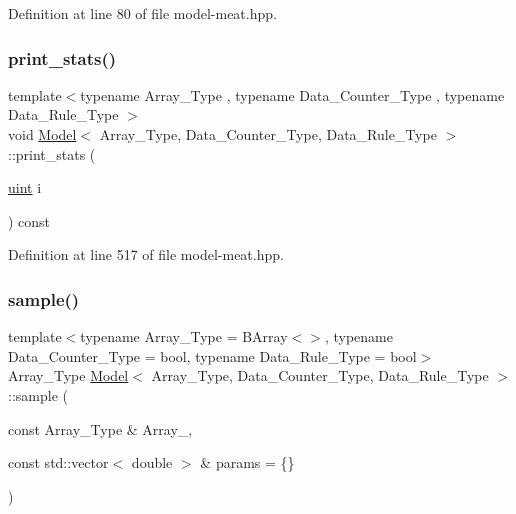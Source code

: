 Definition at line 80 of file model-\/meat.\+hpp.

\mbox{\label{class_model_ac00b5c6a1446ad00fdf1d92c9cb1df3c}} 
\subsubsection{\texorpdfstring{print\+\_\+stats()}{print\_stats()}}
{\footnotesize\ttfamily template$<$typename Array\+\_\+\+Type , typename Data\+\_\+\+Counter\+\_\+\+Type , typename Data\+\_\+\+Rule\+\_\+\+Type $>$ \\
void \hyperlink{class_model}{Model}$<$ Array\+\_\+\+Type, Data\+\_\+\+Counter\+\_\+\+Type, Data\+\_\+\+Rule\+\_\+\+Type $>$\+::print\+\_\+stats (\begin{DoxyParamCaption}\item[{\hyperlink{typedefs_8hpp_a91ad9478d81a7aaf2593e8d9c3d06a14}{uint}}]{i }\end{DoxyParamCaption}) const\hspace{0.3cm}{\ttfamily [inline]}}



Definition at line 517 of file model-\/meat.\+hpp.

\mbox{\label{class_model_a59e37db45e1751a6205db129a5c114c1}} 
\subsubsection{\texorpdfstring{sample()}{sample()}\hspace{0.1cm}{\footnotesize\ttfamily [1/2]}}
{\footnotesize\ttfamily template$<$typename Array\+\_\+\+Type = B\+Array$<$$>$, typename Data\+\_\+\+Counter\+\_\+\+Type = bool, typename Data\+\_\+\+Rule\+\_\+\+Type = bool$>$ \\
Array\+\_\+\+Type \hyperlink{class_model}{Model}$<$ Array\+\_\+\+Type, Data\+\_\+\+Counter\+\_\+\+Type, Data\+\_\+\+Rule\+\_\+\+Type $>$\+::sample (\begin{DoxyParamCaption}\item[{const Array\+\_\+\+Type \&}]{Array\+\_\+,  }\item[{const std\+::vector$<$ double $>$ \&}]{params = {\ttfamily \{\}} }\end{DoxyParamCaption})}

